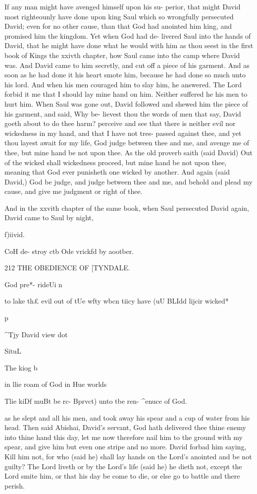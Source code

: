 \documentclass{custom}
\begin{document}
If any man might have avenged himself upon his su- 
perior, that might David most righteounly have done upon
king Saul which so wrongfully persecuted David; even 
for no other cause, than that God had anointed him king, 
and promised him the kingdom. Yet when God had de- 
livered Saul into the hands of David, that he might have 
done what he would with him as thou seest in the first book 
of Kings the xxivth chapter, how Saul came into the camp 
where David was. And David came to him secretly, and 
cut off a piece of his garment. And as soon as he had 
done it his heart smote him, because he had done so much 
unto his lord. And when his men couraged him to slay 
him, he answered. The Lord forbid it me that I should 
lay mine hand on him. Neither suffered he his men to 
hurt him. When Saul was gone out, David followed and 
shewed him the piece of his garment, and said, Why be- 
lievest thou the words of men that say, David goeth about 
to do thee harm? perceive and see that there is neither 
evil nor wickedness in my hand, and that I have not tres- 
passed against thee, and yet thou layest await for my life, 
God judge between thee and me, and avenge me of thee, 
but mine hand be not upon thee. As the old proverb saith 
(said David) Out of the wicked shall wickedness proceed, 
but mine hand be not upon thee, meaning that God ever 
punisheth one wicked by another. And again (said David,) 
God be judge, and judge between thee and me, and 
behold and plead my cause, and give me judgment or right 
of thee. 

And in the xxvith chapter of the same book, when Saul 
persecuted David again, David came to Saul by night, 

f)iivid. 

CoH de- 
stroy ctb 
Ode vrickfd 
by aootber. 


212
THE OBEDIENCE OF 
[TYNDALE.

God pre*- 
rideUi n 

to lake th£ 
evil out of 
tUe wfty 
wbcn tiicy 
have (uU 
BLIdd lijcir 
wicked* 

p 

^Tjy David 
view dot 

SituL 

The kiog b 

in llie roam 
of God in 
Hue worlds 

Tlie kiDf 
muBt be rc- 
Bprvct) unto 
tbe ren- 
^enuce of 
God. 

as he slept and all his men, and took away his spear and a 
cup of water from his head. Then said Abishai, David's
servant, God hath delivered thee thine enemy into thine 
hand this day, let me now therefore nail him to the ground 
with my spear, and give him but even one stripe and no 
more. David forbad him saying, Kill him not, for who 
(said he) shall lay hands on the Lord's anointed and be 
not guilty? The Lord liveth or by the Lord's life (said he) 
he dieth not, except the Lord smite him, or that his day be 
come to die, or else go to battle and there perish.
\end{document}
